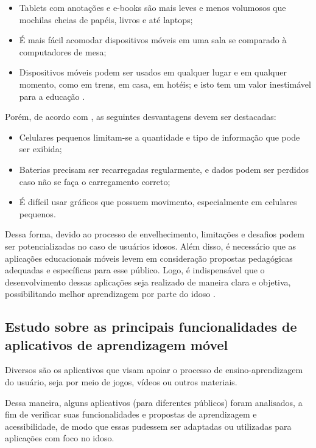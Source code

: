 \begin{itemize}
    \item Tablets com anotações e e-books são mais leves e menos volumosos que mochilas cheias de papéis, livros e até laptops;
    \item É mais fácil acomodar dispositivos móveis em uma sala se comparado à computadores de mesa;
    \item Dispositivos móveis podem ser usados em qualquer lugar e em qualquer momento, como em trens, em casa, em hotéis; e isto tem um valor inestimável para a educação \citep{CarmaMaia2008}.
\end{itemize}

Porém, de acordo com \cite{RICHAMEHTA2016}, as seguintes desvantagens devem ser destacadas: 

\begin{itemize}
    \item Celulares pequenos limitam-se a quantidade e tipo de informação que pode ser exibida;
    \item Baterias precisam ser recarregadas regularmente, e dados podem ser perdidos caso não se faça o carregamento correto;
    \item É difícil usar gráficos que possuem movimento, especialmente em celulares pequenos.
\end{itemize}

Dessa forma, devido ao processo de envelhecimento, limitações e desafios podem ser potencializadas no caso de usuários idosos. Além disso, é necessário que as aplicações educacionais móveis levem em consideração propostas pedagógicas adequadas e específicas para esse público. Logo, é indispensável que o desenvolvimento dessas aplicações seja realizado de maneira clara e objetiva, possibilitando melhor aprendizagem por parte do idoso \citep{giubilei1993pedagogia}.

\subsection{Estudo sobre as principais funcionalidades de aplicativos de aprendizagem móvel}

Diversos são os aplicativos que visam apoiar o processo de ensino-aprendizagem do usuário, seja por meio de jogos, vídeos ou outros materiais. 

Dessa maneira, alguns aplicativos (para diferentes públicos) foram analisados, a fim de verificar suas funcionalidades e propostas de aprendizagem e acessibilidade, de modo que essas pudessem ser adaptadas ou utilizadas para aplicações com foco no idoso.

